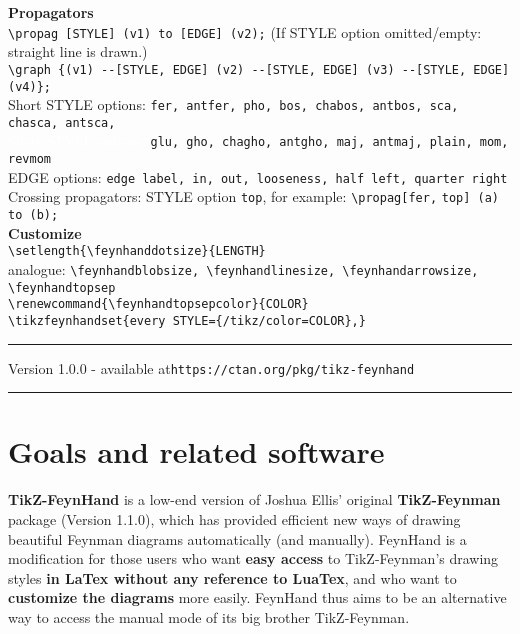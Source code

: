 \documentclass[10pt,letterpaper,twoside,notitlepage]{article}
\numberwithin{figure}{section}
\begin{document}
%
\noindent
\textbf{Propagators}\\
\vercol\verb!\propag [STYLE] (v1) to [EDGE] (v2);!\txcol\qquad\qquad
(If STYLE option omitted/empty: straight line is drawn.)\\
\vercol\verb!\graph {(v1) --[STYLE, EDGE] (v2) --[STYLE, EDGE] (v3) --[STYLE, EDGE] (v4)};!\txcol
\\[1mm]
Short STYLE options: \vercol\verb!fer, antfer, pho, bos, chabos, antbos, sca, chasca, antsca,!\\ 
\textcolor{white}{Short STYLE options:} 
\verb!glu, gho, chagho, antgho, maj, antmaj, plain, mom, revmom!\txcol\\
EDGE options: \vercol\verb!edge label, in, out, looseness, half left, quarter right!\txcol
\\
Crossing propagators:\quad
STYLE option \redcol\verb!top!\txcol, 
for example: \vercol\verb!\propag[fer,! \redcol\verb!top!\vercol\verb!] (a) to (b);!\txcol
\vspace{1.5mm}\\
%
\noindent
\textbf{Customize}\\
\blucol\verb!\setlength{\feynhanddotsize}{LENGTH}!\txcol\\
analogue: 
\blucol\verb!\feynhandblobsize, \feynhandlinesize, \feynhandarrowsize, \feynhandtopsep!\txcol\\
\blucol\verb!\renewcommand{\feynhandtopsepcolor}{COLOR}!\txcol\\
\blucol\verb!\tikzfeynhandset{every STYLE={/tikz/color=COLOR},}!\txcol\\
\vspace{1mm}
%
\hrule
\vspace{2mm}

{\centering Version 1.0.0 - 
 available at\qquad  \texttt{https://ctan.org/pkg/tikz-feynhand}\\}

\vspace{1mm}

\hrule
%
\tableofcontents
%
%
%
%
\section{Goals and related software}
\label{sec:_goals}
%
\noindent
\textbf{TikZ-FeynHand} is a low-end version of Joshua Ellis' original
\textbf{TikZ-Feynman} package \cite{tikzfeynman} (Version 1.1.0),
which has provided efficient new ways of drawing beautiful Feynman diagrams automatically 
(and manually).
FeynHand is a modification for those users who want \textbf{easy access} to TikZ-Feynman's
drawing styles \textbf{in LaTex without any reference to LuaTex},
and who want to \textbf{customize the diagrams} more easily.
FeynHand thus aims to be an alternative way to access
the manual mode of its big brother TikZ-Feynman.
\end{document}
